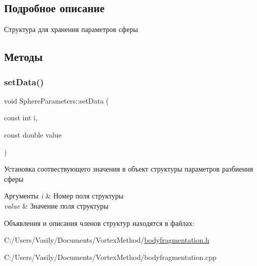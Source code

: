 \subsection{Подробное описание}
Структура для хранения параметров сферы 

\subsection{Методы}
\mbox{\label{struct_sphere_parameters_a4cfbd8b09594f387641ee6c365fa9778}} 
\subsubsection{\texorpdfstring{set\+Data()}{setData()}}
{\footnotesize\ttfamily void Sphere\+Parameters\+::set\+Data (\begin{DoxyParamCaption}\item[{const int}]{i,  }\item[{const double}]{value }\end{DoxyParamCaption})}

Установка соотвествующего значения в объект структуры параметров разбиения сферы 
\begin{DoxyParams}{Аргументы}
{\em i} & Номер поля структуры \\
\hline
{\em value} & Значение поля структуры \\
\hline
\end{DoxyParams}


Объявления и описания членов структур находятся в файлах\+:\begin{DoxyCompactItemize}
\item 
C\+:/\+Users/\+Vasily/\+Documents/\+Vortex\+Method/\mbox{\hyperlink{bodyfragmentation_8h}{bodyfragmentation.\+h}}\item 
C\+:/\+Users/\+Vasily/\+Documents/\+Vortex\+Method/bodyfragmentation.\+cpp\end{DoxyCompactItemize}
